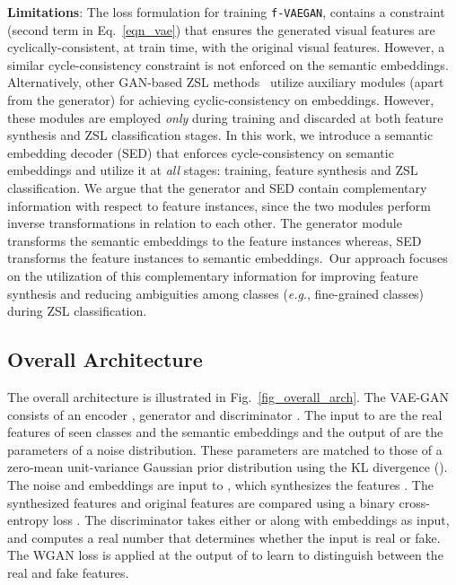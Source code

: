 \documentclass[runningheads]{llncs}
\def\eg{\emph{e.g}.}
\newcommand{\vaegan}{\texttt{f-VAEGAN}}
\begin{document}
\noindent\textbf{Limitations}: The loss formulation for training \vaegan, contains a constraint (second term in Eq.~\ref{eqn_vae}) that ensures the generated visual features are cyclically-consistent, at train time, with the original visual features. However, a similar cycle-consistency constraint is not enforced on the semantic embeddings. Alternatively, other GAN-based ZSL methods~\cite{Rafael18eccv,Zhang18ijcai} utilize auxiliary modules (apart from the generator) for achieving cyclic-consistency on embeddings. However, these modules are employed \textit{only} during training and discarded at both feature synthesis and ZSL classification stages. In this work, we introduce a semantic embedding decoder (SED) that enforces cycle-consistency on semantic embeddings and utilize it at \textit{all} stages: training, feature synthesis and ZSL classification. We argue that the generator and SED contain complementary information with respect to feature instances, since the two modules perform inverse transformations in relation to each other. The generator module transforms the semantic embeddings to the feature instances whereas, SED transforms the feature instances to semantic embeddings.~Our approach focuses on the utilization of this complementary information for improving feature synthesis and reducing ambiguities among classes (\eg, fine-grained classes) during ZSL classification. 


\subsection{Overall Architecture\label{sec_overall_arch}}
The overall architecture is illustrated in Fig.~\ref{fig_overall_arch}. The VAE-GAN consists of an encoder , generator  and discriminator . The input to  are the real features of seen classes  and the semantic embeddings  and the output of  are the parameters of a noise distribution. These parameters are matched to those of a zero-mean unit-variance Gaussian prior distribution using the KL divergence (). The noise  and embeddings  are input to , which synthesizes the features . The synthesized features  and original features  are compared using a binary cross-entropy loss . The discriminator  takes either  or  along with embeddings  as input, and computes a real number that determines whether the input is real or fake. The WGAN loss  is applied at the output of  to learn to distinguish between the real and fake features.  
\end{document}

